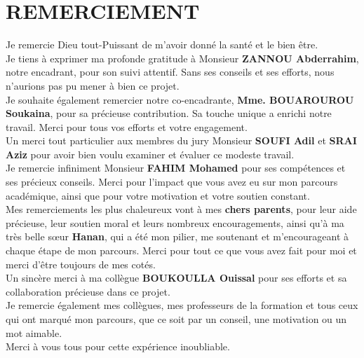 \newpage
\chapter*{REMERCIEMENT}

\normalsize
Je remercie Dieu tout-Puissant de m'avoir donné la santé et le bien être. \\
Je tiens à exprimer ma profonde gratitude à Monsieur  \textbf{ZANNOU Abderrahim}, notre encadrant,  pour son suivi attentif. Sans ses conseils et ses efforts, nous n'aurions pas pu mener à bien ce projet.\\ 
Je souhaite également remercier notre co-encadrante, \textbf{Mme. BOUAROUROU Soukaina}, pour sa précieuse contribution. Sa touche unique a enrichi notre travail. Merci pour tous vos efforts et votre engagement.\\
Un merci tout particulier aux membres du jury Monsieur \textbf{SOUFI Adil} et \textbf{SRAI Aziz} pour avoir bien voulu examiner et évaluer ce modeste travail.\\
Je remercie infiniment Monsieur \textbf{FAHIM Mohamed} pour ses compétences et ses précieux conseils. Merci pour l'impact que vous avez eu sur mon parcours académique, ainsi que pour votre motivation et votre soutien constant.\\
Mes remerciements les plus chaleureux vont à mes \textbf{chers parents}, pour leur aide précieuse, leur soutien moral et leurs nombreux encouragements,  ainsi qu'à ma très belle sœur \textbf{Hanan}, qui a été mon pilier, me soutenant et m'encourageant à chaque étape de mon parcours. Merci pour tout ce que vous avez fait pour moi et merci d'être toujours de mes cotés.  \\ 
Un sincère merci à ma collègue \textbf{BOUKOULLA Ouissal} pour ses efforts et sa collaboration précieuse dans ce projet.\\
Je remercie également mes collègues, mes professeurs de la formation et tous ceux qui ont marqué mon parcours, que ce soit par un conseil, une motivation ou un mot aimable.  \\
Merci à vous tous pour cette expérience inoubliable.


